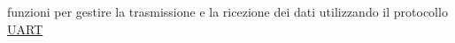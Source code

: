 funzioni per gestire la trasmissione e la ricezione dei dati utilizzando il protocollo \hyperlink{structUART}{U\+A\+RT} 